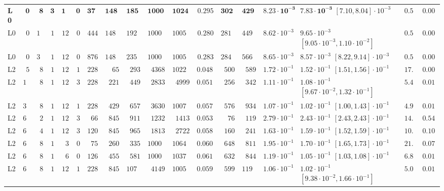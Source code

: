 \begin{table}[!htbp]
{\begin{tabular}{@{}lrrrrrrrrrrrrrrlrr@{}}
\textbf{L0} & $\mathbf{0}$ & $\mathbf{8}$ & $\mathbf{3}$ & $\mathbf{12}$ & $\mathbf{0}$ & $\mathbf{372}$ & $\mathbf{1480}$ & $\mathbf{1852}$ & $\mathbf{10000}$ & $\mathbf{10248}$ & $\mathbf{0.295}$ & $\mathbf{3020}$ & $\mathbf{4290}$ & $\mathbf{8.23\cdot 10^{-3}}$ & $\mathbf{7.83\cdot 10^{-3}}$ $[7.10, 8.04]\cdot 10^{-3}$ & $\mathbf{0.54}$ & $\mathbf{0.000}$ \\
L0 & $0$ & $16$ & $1$ & $12$ & $0$ & $444$ & $1480$ & $1924$ & $10000$ & $10059$ & $0.280$ & $2810$ & $4490$ & $8.62\cdot 10^{-3}$ & $9.65\cdot 10^{-3}$ $[9.05\cdot 10^{-3}, 1.10\cdot 10^{-2}]$ & $0.55$ & $0.001$ \\
L0 & $0$ & $32$ & $1$ & $12$ & $0$ & $876$ & $1480$ & $2356$ & $10000$ & $10051$ & $0.283$ & $2840$ & $5660$ & $8.65\cdot 10^{-3}$ & $8.57\cdot 10^{-3}$ $[8.22, 9.14]\cdot 10^{-3}$ & $0.56$ & $0.000$ \\
\midrule
L2 & $5$ & $8$ & $1$ & $12$ & $1$ & $228$ & $65$ & $293$ & $4368$ & $10221$ & $0.0489$ & $500$ & $589$ & $1.72\cdot 10^{-1}$ & $1.52\cdot 10^{-1}$ $[1.51, 1.56]\cdot 10^{-1}$ & $17.4$ & $0.006$ \\
L2 & $17$ & $8$ & $1$ & $12$ & $3$ & $228$ & $221$ & $449$ & $2833$ & $4999$ & $0.0511$ & $256$ & $342$ & $1.11\cdot 10^{-1}$ & $1.08\cdot 10^{-1}$ $[9.67\cdot 10^{-2}, 1.32\cdot 10^{-1}]$ & $5.41$ & $0.017$ \\
L2 & $33$ & $8$ & $1$ & $12$ & $1$ & $228$ & $429$ & $657$ & $3630$ & $10075$ & $0.0572$ & $576$ & $934$ & $1.07\cdot 10^{-1}$ & $1.02\cdot 10^{-1}$ $[1.00, 1.43]\cdot 10^{-1}$ & $4.91$ & $0.015$ \\
L2 & $65$ & $2$ & $1$ & $12$ & $3$ & $66$ & $845$ & $911$ & $1232$ & $1413$ & $0.0539$ & $76$ & $119$ & $2.79\cdot 10^{-1}$ & $2.43\cdot 10^{-1}$ $[2.43, 2.43]\cdot 10^{-1}$ & $14.1$ & $0.540$ \\
L2 & $65$ & $4$ & $1$ & $12$ & $3$ & $120$ & $845$ & $965$ & $1813$ & $2722$ & $0.0586$ & $160$ & $241$ & $1.63\cdot 10^{-1}$ & $1.59\cdot 10^{-1}$ $[1.52, 1.59]\cdot 10^{-1}$ & $10.5$ & $0.102$ \\
L2 & $65$ & $8$ & $1$ & $3$ & $0$ & $75$ & $260$ & $335$ & $10000$ & $10644$ & $0.0609$ & $648$ & $811$ & $1.95\cdot 10^{-1}$ & $1.70\cdot 10^{-1}$ $[1.65, 1.73]\cdot 10^{-1}$ & $21.4$ & $0.072$ \\
L2 & $65$ & $8$ & $1$ & $6$ & $0$ & $126$ & $455$ & $581$ & $10000$ & $10371$ & $0.0610$ & $632$ & $844$ & $1.19\cdot 10^{-1}$ & $1.05\cdot 10^{-1}$ $[1.03, 1.08]\cdot 10^{-1}$ & $6.85$ & $0.013$ \\
L2 & $65$ & $8$ & $1$ & $12$ & $1$ & $228$ & $845$ & $1073$ & $4149$ & $10051$ & $0.0596$ & $599$ & $1190$ & $1.06\cdot 10^{-1}$ & $1.02\cdot 10^{-1}$ $[9.38\cdot 10^{-2}, 1.66\cdot 10^{-1}]$ & $5.09$ & $0.014$ \\

\end{tabular}}
\end{table}
